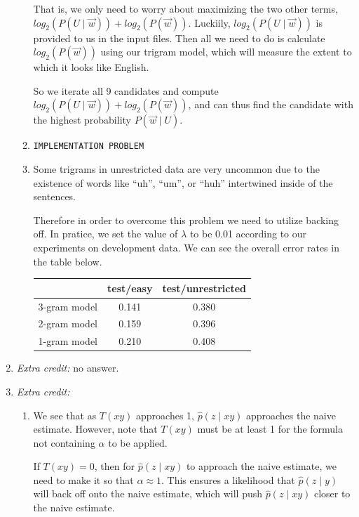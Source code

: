 \documentclass[11pt]{article}
\begin{document}
\begin{enumerate}
\begin{enumerate}[label=(\alph*)]
		That is, we only need to worry about maximizing the two other terms, $log_2(P(U \mid \vec{w})) + log_2(P(\vec{w}))$. Luckiily, $log_2(P(U \mid \vec{w}))$ is provided to us in the input files. Then all we need to do is calculate $log_2(P(\vec{w}))$ using our trigram model, which will measure the extent to which it looks like English. \vspace{4pt}

		So we iterate all 9 candidates and compute $log_2(P(U \mid \vec{w})) + log_2(P(\vec{w}))$, and can thus find the candidate with the highest probability $P(\vec{w} \mid U)$.
	\item
		\texttt{IMPLEMENTATION PROBLEM}
	\item
		Some trigrams in unrestricted data are very uncommon due to the existence of words like ``uh'', ``um'', or ``huh'' intertwined inside of the sentences. \vspace{4pt}

		Therefore in order to overcome this problem we need to utilize backing off. In pratice, we set the value of $\lambda$ to be 0.01 according to our experiments on development data. We can see the overall error rates in the table below. \\

		\begin{center}\begin{tabular}{| r || c | c |}
			\hline
			\ 				&	test/easy	&	test/unrestricted 	\\
			\hline \hline
			3-gram model 	&	0.141		&	0.380				\\
			2-gram model 	&	0.159		&	0.396				\\
			1-gram model 	&	0.210		&	0.408				\\
			\hline	
		\end{tabular}\end{center}

	\end{enumerate}
\item %
	\textit{Extra credit:} no answer.
\item %
	\textit{Extra credit:}
	\begin{enumerate}[label=(\alph*)]
	\item
		We see that as $T(xy)$ approaches 1, $\hat{p}(z \mid xy)$ approaches the naive estimate. However, note that $T(xy)$ must be at least 1 for the formula not containing $\alpha$ to be applied.

		If $T(xy) = 0$, then for $\hat{p}(z \mid xy)$ to approach the naive estimate, we need to make it so that $\alpha \approx 1$. This ensures a likelihood that $\hat{p}(z \mid y)$ will back off onto the naive estimate, which will push $\hat{p}(z \mid xy)$ closer to the naive estimate.


\end{enumerate}
\end{enumerate}
\end{document}
